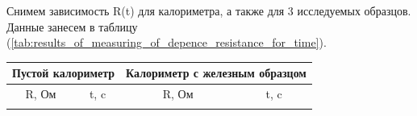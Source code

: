 \documentclass[12pt,a4paper]{article}
\begin{document}
Снимем зависимость R(t) для калориметра, а также для 3 исследуемых образцов. Данные занесем в таблицу (\ref{tab:results_of_measuring_of_depence_resistance_for_time}).
	
\begin{table}[h!]
\begin{center}
\begin{tabular}{|p{3cm}|p{3cm}||p{3cm}p{3cm}|}


\hline \hline
\multicolumn{2}{||c|}{Пустой калориметр}                                                          & \multicolumn{2}{|c||}{Калориметр с железным образцом} \\ \hline

\multicolumn{1}{||c|}{R, Ом}  & \multicolumn{1}{|c|}{t, c}    & \multicolumn{1}{|c|}{R, Ом}  & \multicolumn{1}{|c||}{t, c}       \\ \hline \hline

\hline

\multicolumn{4}{l}{}\\

\hline


\end{tabular}
\end{center}
\end{table}
\end{document}

